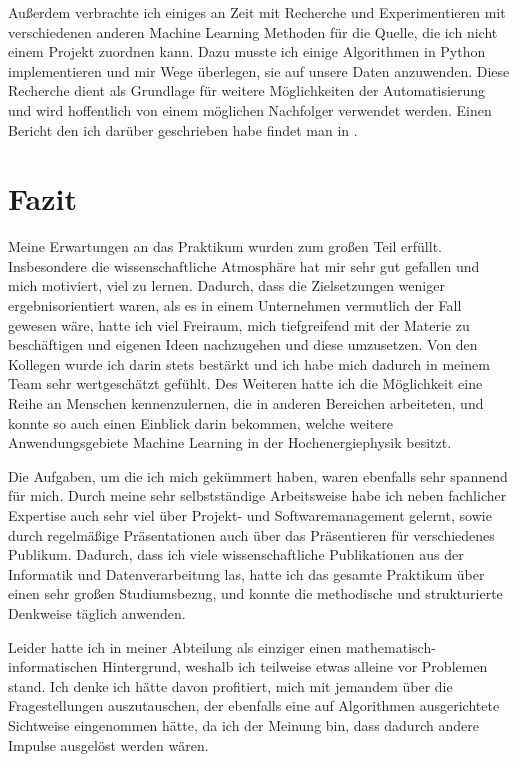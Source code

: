 \documentclass[11pt, a4paper, titlepage, headings=standardclasses]{scrartcl}
\begin{document}
Außerdem verbrachte ich einiges an Zeit mit Recherche und Experimentieren mit verschiedenen anderen Machine Learning Methoden für die Quelle, die ich nicht einem Projekt zuordnen kann. Dazu musste ich einige Algorithmen in Python implementieren und mir Wege überlegen, sie auf unsere Daten anzuwenden. Diese Recherche dient als Grundlage für weitere Möglichkeiten der Automatisierung und wird hoffentlich von einem möglichen Nachfolger verwendet werden. Einen Bericht den ich darüber geschrieben habe findet man in \cite{Mihailescu:MLresearch}.

\section{Fazit}

Meine Erwartungen an das Praktikum wurden zum großen Teil erfüllt. Insbesondere die wissenschaftliche Atmosphäre hat mir sehr gut gefallen und mich motiviert, viel zu lernen. Dadurch, dass die Zielsetzungen weniger ergebnisorientiert waren, als es in einem Unternehmen vermutlich der Fall gewesen wäre, hatte ich viel Freiraum, mich tiefgreifend mit der Materie zu beschäftigen und eigenen Ideen nachzugehen und diese umzusetzen. Von den Kollegen wurde ich darin stets bestärkt und ich habe mich dadurch in meinem Team sehr wertgeschätzt gefühlt. Des Weiteren hatte ich die Möglichkeit eine Reihe an Menschen kennenzulernen, die in anderen Bereichen arbeiteten, und konnte so auch einen Einblick darin bekommen, welche weitere Anwendungsgebiete Machine Learning in der Hochenergiephysik besitzt.

Die Aufgaben, um die ich mich gekümmert haben, waren ebenfalls sehr spannend für mich. Durch meine sehr selbstständige Arbeitsweise habe ich neben fachlicher Expertise auch sehr viel über Projekt- und Softwaremanagement gelernt, sowie durch regelmäßige Präsentationen auch über das Präsentieren für verschiedenes Publikum. Dadurch, dass ich viele wissenschaftliche Publikationen aus der Informatik und Datenverarbeitung las, hatte ich das gesamte Praktikum über einen sehr großen Studiumsbezug, und konnte die methodische und strukturierte Denkweise täglich anwenden.

Leider hatte ich in meiner Abteilung als einziger einen mathematisch-informatischen Hintergrund, weshalb ich teilweise etwas alleine vor Problemen stand. Ich denke ich hätte davon profitiert, mich mit jemandem über die Fragestellungen auszutauschen, der ebenfalls eine auf Algorithmen ausgerichtete Sichtweise eingenommen hätte, da ich der Meinung bin, dass dadurch andere Impulse ausgelöst werden wären.
\end{document}
